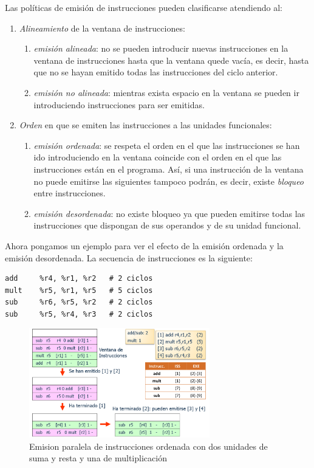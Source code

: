 \documentclass[10pt,a4paper,spanish]{report}
\begin{document}
Las políticas de emisión de instrucciones pueden clasificarse atendiendo al:
\begin{enumerate}[\color{azul}{$\heartsuit$}]
    \item \textcolor{azul}{\textit{Alineamiento}} de la ventana de instrucciones:
    \begin{enumerate}[$\longrightarrow$]
        \item \textcolor{azul}{\textit{emisión alineada}}: no se pueden introducir nuevas instrucciones en la ventana de instrucciones hasta que la ventana quede vacía, es decir, hasta que no se hayan emitido todas las instrucciones del ciclo anterior.
        \item \textcolor{azul}{\textit{emisión no alineada}}: mientras exista espacio en la ventana se pueden ir introduciendo instrucciones para ser emitidas.
    \end{enumerate}
    \item \textcolor{azul}{\textit{Orden}} en que se emiten las instrucciones a las unidades funcionales:
    \begin{enumerate}[$\longrightarrow$]
        \item \textcolor{azul}{\textit{emisión ordenada}}: se respeta el orden en el que las instrucciones se han ido introduciendo en la ventana coincide con el orden en el que las instrucciones están en el programa. Así, si una instrucción de la ventana no puede emitirse las siguientes tampoco podrán, es decir, existe \textit{\textcolor{azul}{bloqueo}} entre instrucciones.
        \item \textcolor{azul}{\textit{emisión desordenada}}: no existe bloqueo ya que pueden emitirse todas las instrucciones que dispongan de sus operandos y de su unidad funcional.
    \end{enumerate}
\end{enumerate}

Ahora pongamos un ejemplo para ver el efecto de la emisión ordenada y la emisión desordenada. La secuencia de instrucciones es la siguiente:
\begin{verbatim}
add     %r4, %r1, %r2   # 2 ciclos
mult    %r5, %r1, %r5   # 5 ciclos
sub     %r6, %r5, %r2   # 2 ciclos
sub     %r5, %r4, %r3   # 2 ciclos
\end{verbatim}

\begin{figure}[!h]
\centering
\includegraphics[width=0.7\textwidth]{86}
\caption{Emision paralela de instrucciones ordenada con dos unidades de suma y resta y una de multiplicación}
\label{em_or}
\end{figure}
\end{document}
